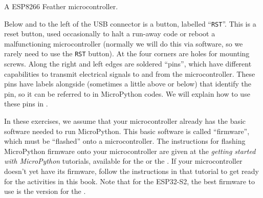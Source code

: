 \begin{marginfigure}[4cm]
	\begin{center}
		\caption[ESP8266 feather microcontroller]{A ESP8266 Feather microcontroller.}
	\end{center}
\end{marginfigure}

Below and to the left of the USB connector is a button, labelled ``\texttt{RST}''.
This is a reset button, used occasionally to halt a run-away code or reboot a malfunctioning microcontroller (normally we will do this via software, so we rarely need to use the \texttt{RST} button).
At the four corners are holes for mounting screws.
Along the right and left edges are soldered ``pins'', %
which have different capabilities to transmit electrical signals to and from the microcontroller.
These pins have labels alongside (sometimes a little above or below) that identify the pin, so it can be referred to in MicroPython codes.
We will explain how to use these pins in .

\begin{kaobox}[frametitle=A flash of insight]
	In these exercises, we assume that your microcontroller already has the basic software needed to run MicroPython. This basic software is called ``firmware'', which must be ``flashed'' onto a microcontroller. The instructions for flashing MicroPython firmware onto your microcontroller are given at the \emph{getting started with MicroPython} tutorials, available for the  or the . If your microcontroller doesn't yet have its firmware, follow the instructions in that tutorial to get ready for the activities in this book. Note that for the ESP32-S2, the best firmware to use is the version for the . 
\end{kaobox}




